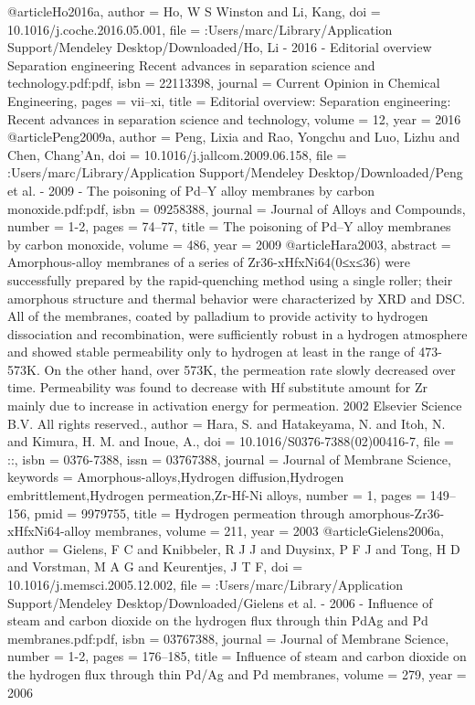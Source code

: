 @article{Ho2016a,
author = {Ho, W S Winston and Li, Kang},
doi = {10.1016/j.coche.2016.05.001},
file = {:Users/marc/Library/Application Support/Mendeley Desktop/Downloaded/Ho, Li - 2016 - Editorial overview Separation engineering Recent advances in separation science and technology.pdf:pdf},
isbn = {22113398},
journal = {Current Opinion in Chemical Engineering},
pages = {vii--xi},
title = {{Editorial overview: Separation engineering: Recent advances in separation science and technology}},
volume = {12},
year = {2016}
}
@article{Peng2009a,
author = {Peng, Lixia and Rao, Yongchu and Luo, Lizhu and Chen, Chang'An},
doi = {10.1016/j.jallcom.2009.06.158},
file = {:Users/marc/Library/Application Support/Mendeley Desktop/Downloaded/Peng et al. - 2009 - The poisoning of Pd–Y alloy membranes by carbon monoxide.pdf:pdf},
isbn = {09258388},
journal = {Journal of Alloys and Compounds},
number = {1-2},
pages = {74--77},
title = {{The poisoning of Pd–Y alloy membranes by carbon monoxide}},
volume = {486},
year = {2009}
}
@article{Hara2003,
abstract = {Amorphous-alloy membranes of a series of Zr36-xHfxNi64(0≤x≤36) were successfully prepared by the rapid-quenching method using a single roller; their amorphous structure and thermal behavior were characterized by XRD and DSC. All of the membranes, coated by palladium to provide activity to hydrogen dissociation and recombination, were sufficiently robust in a hydrogen atmosphere and showed stable permeability only to hydrogen at least in the range of 473-573K. On the other hand, over 573K, the permeation rate slowly decreased over time. Permeability was found to decrease with Hf substitute amount for Zr mainly due to increase in activation energy for permeation. {\textcopyright} 2002 Elsevier Science B.V. All rights reserved.},
author = {Hara, S. and Hatakeyama, N. and Itoh, N. and Kimura, H. M. and Inoue, A.},
doi = {10.1016/S0376-7388(02)00416-7},
file = {::},
isbn = {0376-7388},
issn = {03767388},
journal = {Journal of Membrane Science},
keywords = {Amorphous-alloys,Hydrogen diffusion,Hydrogen embrittlement,Hydrogen permeation,Zr-Hf-Ni alloys},
number = {1},
pages = {149--156},
pmid = {9979755},
title = {{Hydrogen permeation through amorphous-Zr36-xHfxNi64-alloy membranes}},
volume = {211},
year = {2003}
}
@article{Gielens2006a,
author = {Gielens, F C and Knibbeler, R J J and Duysinx, P F J and Tong, H D and Vorstman, M A G and Keurentjes, J T F},
doi = {10.1016/j.memsci.2005.12.002},
file = {:Users/marc/Library/Application Support/Mendeley Desktop/Downloaded/Gielens et al. - 2006 - Influence of steam and carbon dioxide on the hydrogen flux through thin PdAg and Pd membranes.pdf:pdf},
isbn = {03767388},
journal = {Journal of Membrane Science},
number = {1-2},
pages = {176--185},
title = {{Influence of steam and carbon dioxide on the hydrogen flux through thin Pd/Ag and Pd membranes}},
volume = {279},
year = {2006}
}
